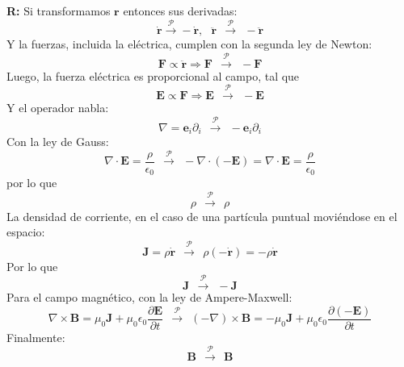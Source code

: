 \documentclass[]{article}
\numberwithin{equation}{section}
\newcommand{\0}{\textcolor{gray}{0}}
\newcommand{\ei}{\mathbf{e}_i}
\newcommand{\gr}{\nabla}
\newcommand{\di}{\nabla\cdot}
\newcommand{\ro}{\nabla\times}
\newcommand{\rv}{\mathbf{r}}
\newcommand{\eo}{\epsilon_{0}}
\newcommand{\uo}{\mu_{0}}
\newcommand{\pd}[2]{\dfrac{\partial #1}{\partial #2}}
\newcommand{\n}[1]{\mathbf{#1}}
\begin{document}
\begin{enumerate}
\begin{enumerate}
		\textbf{R:} Si transformamos \(\rv\) entonces sus derivadas:
		\begin{equation*}
			\dot{\rv} \xrightarrow{\mathcal{P}} -\dot{\rv}, ~~~ \ddot{\rv} ~~\xrightarrow{\mathcal{P}}~~ -\ddot{\rv}
		\end{equation*}
		Y la fuerzas, incluida la eléctrica, cumplen con la segunda ley de Newton:
		\begin{equation*}
			\n{F} \propto \ddot{\rv} \Rightarrow \n{F} ~~\xrightarrow{\mathcal{P}}~~ -\n{F}
		\end{equation*}
		Luego, la fuerza eléctrica es proporcional al campo, tal que
		\begin{equation*}
			\n{E} \propto \n{F} \Rightarrow \n{E} ~~\xrightarrow{\mathcal{P}}~~ -\n{E}
		\end{equation*}
		Y el operador nabla:
		\begin{equation*}
			\nabla = \ei\partial_i ~~\xrightarrow{\mathcal{P}}~~ -\ei\partial_i
		\end{equation*}
		Con la ley de Gauss:
		\begin{equation*}
			\di\n{E} = \dfrac{\rho}{\eo} ~~\xrightarrow{\mathcal{P}}~~ -\di(-\n{E}) = \di\n{E} = \dfrac{\rho}{\eo}
		\end{equation*}
		por lo que
		\begin{equation*}
			\rho ~~\xrightarrow{\mathcal{P}}~~ \rho
		\end{equation*}
		La densidad de corriente, en el caso de una partícula puntual moviéndose en el espacio:
		\begin{equation*}
			\n{J} = \rho \dot{\rv} ~~\xrightarrow{\mathcal{P}}~~ \rho (- \dot{\rv}) = - \rho \dot{\rv}
		\end{equation*}
		Por lo que
		\begin{equation*}
			\n{J} ~~\xrightarrow{\mathcal{P}}~~ -\n{J}
		\end{equation*}
		Para el campo magnético, con la ley de Ampere-Maxwell:
		\begin{equation*}
			\ro\n{B} = \uo\n{J} + \uo\eo\pd{\n{E}}{t} ~~\xrightarrow{\mathcal{P}}~~ (-\gr)\times\n{B} = -\uo\n{J} + \uo\eo\pd{(-\n{E})}{t}
		\end{equation*}
		Finalmente:
		\begin{equation*}
			\n{B} ~~\xrightarrow{\mathcal{P}}~~ \n{B}
		\end{equation*}
	\end{enumerate}
	
\end{enumerate}
\end{document}
